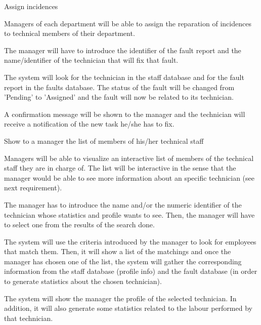 \begin{requirement}{Assign incidences}

\reqdesc Managers of each department will be able to assign the reparation of incidences to technical members of their department.

\reqin The manager will have to introduce the identifier of the fault report and the name/identifier of the technician that will fix that fault.

\reqsteps The system will look for the technician in the staff database and for the fault report in the faults database. The status of the fault will be changed from 'Pending' to 'Assigned' and the fault will now be related to its technician.

\reqout A confirmation message will be shown to the manager and the technician will receive a notification of the new task he/she has to fix.

\end{requirement}


\begin{requirement}{Show to a manager the list of members of his/her technical staff}

\reqdesc Managers will be able to visualize an interactive list of members of the technical staff they are in charge of. The list will be interactive in the sense that the manager would be able to see more information about an specific technician (see next requirement).

\reqin The manager has to introduce the name and/or the numeric identifier of the technician whose statistics and profile wants to see. Then, the manager will have to select one from the results of the search done.

\reqsteps The system will use the criteria introduced by the manager to look for employees that match them. Then, it will show a list of the matchings and once the manager has chosen one of the list, the system will gather the corresponding information from the staff database (profile info) and the fault database (in order to generate statistics about the chosen technician).

\reqout The system will show the manager the profile of the selected technician. In addition, it will also generate some statistics related to the labour performed by that technician.

\end{requirement}


